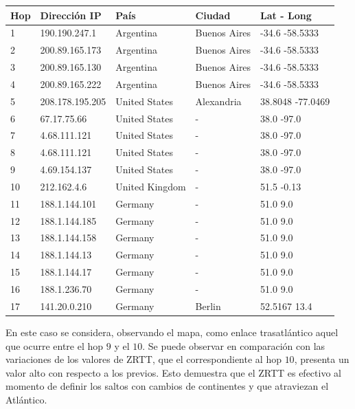 \begin{center}
 \begin{tabular}{|l|l|l|l|l|}
    \hline
    Hop &Dirección IP &País &Ciudad &Lat - Long \\ \hline \hline
    1 & 190.190.247.1 & Argentina & Buenos Aires & -34.6 -58.5333	\\ \hline
    2 & 200.89.165.173 & Argentina & Buenos Aires & -34.6 -58.5333	\\ \hline
    3 & 200.89.165.130 & Argentina & Buenos Aires & -34.6 -58.5333	\\ \hline
    4 & 200.89.165.222 & Argentina & Buenos Aires & -34.6 -58.5333	\\ \hline
    5 & 208.178.195.205 & United States & Alexandria & 38.8048 -77.0469 \\ \hline
    6 & 67.17.75.66 & United States & - & 38.0 -97.0 \\ \hline
    7 & 4.68.111.121 & United States & - & 38.0 -97.0 \\ \hline
    8 & 4.68.111.121 & United States & - & 38.0 -97.0 \\ \hline
    9 & 4.69.154.137 & United States & - & 38.0 -97.0 \\ \hline
    10 & 212.162.4.6 & United Kingdom & - &  51.5 -0.13 \\ \hline
    11 & 188.1.144.101 & Germany & - & 51.0 9.0 \\ \hline
    12 & 188.1.144.185 & Germany & - & 51.0 9.0 \\ \hline
    13 & 188.1.144.158 & Germany & - & 51.0 9.0 \\ \hline
    14 & 188.1.144.13 & Germany & - & 51.0 9.0 \\ \hline
    15 & 188.1.144.17 & Germany & - & 51.0 9.0 \\ \hline
    16 & 188.1.236.70 & Germany & - & 51.0 9.0 \\ \hline
    17 & 141.20.0.210 & Germany & Berlin & 52.5167 13.4 \\ \hline
 \end{tabular}
\end{center}

En este caso se considera, observando el mapa, como enlace trasatlántico aquel que ocurre entre el hop $9$ y el $10$. Se puede observar en comparación con las variaciones de los valores de ZRTT, que el correspondiente al hop $10$, presenta un valor alto con respecto a los previos. Esto demuestra que el ZRTT es efectivo al momento de definir los saltos con cambios de continentes y que atraviezan el Atlántico.


